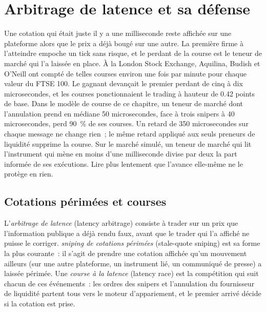 \chapter{Arbitrage de latence et sa défense}\label{ch:hf:latency-arbitrage-and-its-defence}

Une cotation qui était juste il y a une milliseconde reste affichée sur une plateforme alors que le prix a déjà bougé sur une autre. La première firme à l'atteindre empoche un
tick sans risque, et le perdant de la course est le teneur de marché qui l'a laissée en place. À la London Stock Exchange, Aquilina, Budish et O'Neill ont compté
de telles courses environ une fois par minute pour chaque valeur du FTSE 100. Le gagnant devançait le premier perdant de cinq à dix microsecondes, et les courses ponctionnaient le trading à hauteur de
0.42 points de base. Dans le modèle de course de ce chapitre, un teneur de marché dont l'annulation prend en médiane 50 microsecondes, face à trois snipers à 40 microsecondes, perd 90~\% de
ses courses. Un retard de 350 microsecondes sur chaque message ne change rien~; le même retard appliqué aux seuls preneurs de liquidité supprime la course. Sur le marché simulé, un
teneur de marché qui lit l'instrument qui mène en moins d'une milliseconde divise par deux la part informée de ses exécutions. Lire plus lentement que l'avance
elle-même ne le protège en rien.

\section{Cotations périmées et courses}

\begin{definition}\label{def:hf:latency-arbitrage-and-its-defence:arb}
L'\emph{arbitrage de latence} (latency arbitrage) consiste à trader sur un prix que l'information publique a déjà rendu faux, avant que le trader qui l'a affiché
ne puisse le corriger. \emph{sniping de cotations périmées} (stale-quote sniping) est sa forme la plus courante~: il s'agit de prendre une cotation affichée qu'un mouvement ailleurs (sur une autre plateforme,
un instrument lié, un communiqué de presse) a laissée périmée. Une \emph{course à la latence} (latency race) est la compétition qui suit chacun de ces événements~:
les ordres des snipers et l'annulation du fournisseur de liquidité partent tous vers le moteur d'appariement, et le premier arrivé décide si la cotation est
prise.
\end{definition}

